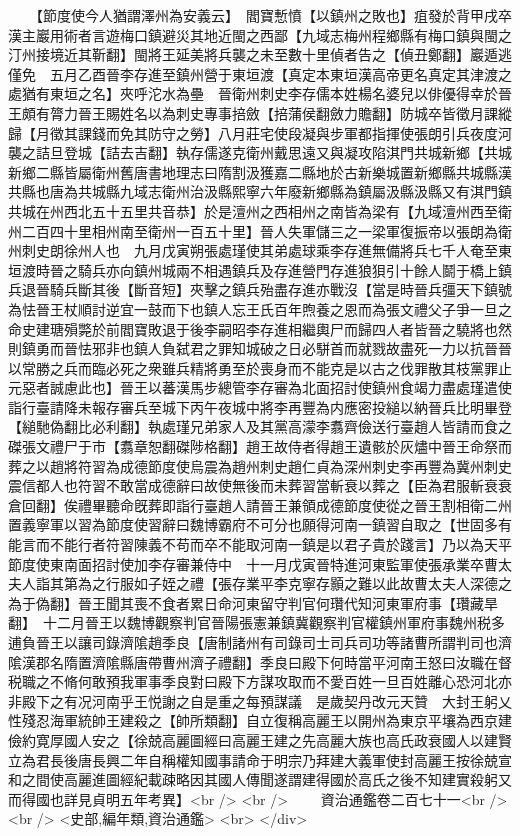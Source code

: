 　　【節度使今人猶謂澤州為安義云】　閻寶慙憤【以鎮州之敗也】疽發於背甲戌卒　漢主巖用術者言遊梅口鎮避災其地近閩之西鄙【九域志梅州程鄉縣有梅口鎮與閩之汀州接境近其靳翻】閩將王延美將兵襲之未至數十里偵者告之【偵丑鄭翻】巖遁逃僅免　五月乙酉晉李存進至鎮州營于東垣渡【真定本東垣漢高帝更名真定其津渡之處猶有東垣之名】夾呼沱水為壘　晉衛州刺史李存儒本姓楊名婆兒以俳優得幸於晉王頗有膂力晉王賜姓名以為刺史專事掊斂【掊蒲侯翻斂力贍翻】防城卒皆徵月課縱歸【月徵其課錢而免其防守之勞】八月莊宅使段凝與步軍都指揮使張朗引兵夜度河襲之詰旦登城【詰去吉翻】執存儒遂克衛州戴思遠又與凝攻陷淇門共城新鄉【共城新鄉二縣皆屬衛州舊唐書地理志曰隋割汲獲嘉二縣地於古新樂城置新鄉縣共城縣漢共縣也唐為共城縣九域志衛州治汲縣熙寧六年廢新鄉縣為鎮屬汲縣汲縣又有淇門鎮共城在州西北五十五里共音恭】於是澶州之西相州之南皆為梁有【九域澶州西至衛州二百四十里相州南至衛州一百五十里】晉人失軍儲三之一梁軍復振帝以張朗為衛州刺史朗徐州人也　九月戊寅朔張處瑾使其弟處球乘李存進無備將兵七千人奄至東垣渡時晉之騎兵亦向鎮州城兩不相遇鎮兵及存進營門存進狼狽引十餘人鬬于橋上鎮兵退晉騎兵斷其後【斷音短】夾擊之鎮兵殆盡存進亦戰沒【當是時晉兵彊天下鎮號為怯晉王杖順討逆宜一鼓而下也鎮人忘王氏百年煦養之恩而為張文禮父子爭一旦之命史建瑭殞斃於前閻寶敗退于後李嗣昭李存進相繼輿尸而歸四人者皆晉之驍將也然則鎮勇而晉怯邪非也鎮人負弑君之罪知城破之日必駢首而就戮故盡死一力以抗晉晉以常勝之兵而臨必死之衆雖兵精將勇至於喪身而不能克是以古之伐罪散其枝黨罪止元惡者誠慮此也】晉王以蕃漢馬步總管李存審為北面招討使鎮州食竭力盡處瑾遣使詣行臺請降未報存審兵至城下丙午夜城中將李再豐為内應密投縋以納晉兵比明畢登【縋馳偽翻比必利翻】執處瑾兄弟家人及其黨高濛李翥齊儉送行臺趙人皆請而食之磔張文禮尸于市【翥章恕翻磔陟格翻】趙王故侍者得趙王遺骸於灰燼中晉王命祭而葬之以趙將符習為成德節度使烏震為趙州刺史趙仁貞為深州刺史李再豐為冀州刺史震信都人也符習不敢當成德辭曰故使無後而未葬習當斬衰以葬之【臣為君服斬衰衰倉回翻】俟禮畢聽命旣葬即詣行臺趙人請晉王兼領成德節度使從之晉王割相衛二州置義寧軍以習為節度使習辭曰魏博霸府不可分也願得河南一鎮習自取之【世固多有能言而不能行者符習陳義不苟而卒不能取河南一鎮是以君子貴於踐言】乃以為天平節度使東南面招討使加李存審兼侍中　十一月戊寅晉特進河東監軍使張承業卒曹太夫人詣其第為之行服如子姪之禮【張存業平李克寧存顥之難以此故曹太夫人深德之為于偽翻】晉王聞其喪不食者累日命河東留守判官何瓚代知河東軍府事【瓚藏旱翻】　十二月晉王以魏博觀察判官晉陽張憲兼鎮冀觀察判官權鎮州軍府事魏州税多逋負晉王以讓司錄濟隂趙季良【唐制諸州有司錄司士司兵司功等諸曹所謂判司也濟隂漢郡名隋置濟隂縣唐帶曹州濟子禮翻】季良曰殿下何時當平河南王怒曰汝職在督税職之不脩何敢預我軍事季良對曰殿下方謀攻取而不愛百姓一旦百姓離心恐河北亦非殿下之有况河南乎王悦謝之自是重之每預謀議　是歲契丹改元天贊　大封王躬乂性殘忍海軍統帥王建殺之【帥所類翻】自立復稱高麗王以開州為東京平壤為西京建儉約寛厚國人安之【徐兢高麗圖經曰高麗王建之先高麗大族也高氏政衰國人以建賢立為君長後唐長興二年自稱權知國事請命于明宗乃拜建大義軍使封高麗王按徐兢宣和之間使高麗進圖經紀載疎略因其國人傳聞遂謂建得國於高氏之後不知建實殺躬又而得國也詳見貞明五年考異】<br />
<br />
　　資治通鑑卷二百七十一<br />
<br />
<史部,編年類,資治通鑑>  <br>
   </div> 

